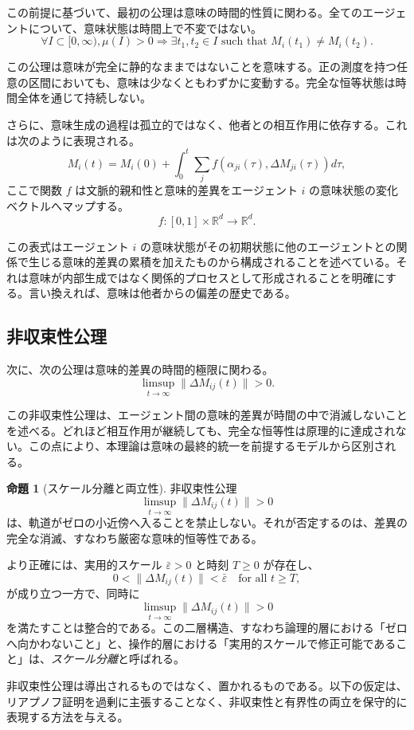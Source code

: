 \documentclass[11pt,a4paper]{article}
\theoremstyle{definition}
\newtheorem{proposition}{命題}[section]
\begin{document}
この前提に基づいて、最初の公理は意味の時間的性質に関わる。全てのエージェントについて、意味状態は時間上で不変ではない。
\[
\forall I \subset [0,\infty), \mu(I) > 0 \Rightarrow \exists t_1, t_2 \in I \text{ such that } M_i(t_1) \neq M_i(t_2).
\]

この公理は意味が完全に静的なままではないことを意味する。正の測度を持つ任意の区間においても、意味は少なくともわずかに変動する。完全な恒等状態は時間全体を通じて持続しない。

さらに、意味生成の過程は孤立的ではなく、他者との相互作用に依存する。これは次のように表現される。
\[
M_i(t) = M_i(0) + \int_0^t \sum_j f(\alpha_{ji}(\tau), \Delta M_{ji}(\tau)) d\tau,
\]
ここで関数 $f$ は文脈的親和性と意味的差異をエージェント $i$ の意味状態の変化ベクトルへマップする。
\[
f : [0, 1] \times \mathbb{R}^d \to \mathbb{R}^d.
\]

この表式はエージェント $i$ の意味状態がその初期状態に他のエージェントとの関係で生じる意味的差異の累積を加えたものから構成されることを述べている。それは意味が内部生成ではなく関係的プロセスとして形成されることを明確にする。言い換えれば、意味は他者からの偏差の歴史である。


\subsection{非収束性公理}

次に、次の公理は意味的差異の時間的極限に関わる。
\[
\limsup_{t \to \infty} \|\Delta M_{ij}(t)\| > 0.
\]

この非収束性公理は、エージェント間の意味的差異が時間の中で消滅しないことを述べる。どれほど相互作用が継続しても、完全な恒等性は原理的に達成されない。この点により、本理論は意味の最終的統一を前提するモデルから区別される。

\begin{proposition}[スケール分離と両立性]
非収束性公理
\[
\limsup_{t \to \infty} \|\Delta M_{ij}(t)\| > 0
\]
は、軌道がゼロの小近傍へ入ることを禁止しない。それが否定するのは、差異の完全な消滅、すなわち厳密な意味的恒等性である。

より正確には、実用的スケール $\bar{\varepsilon}>0$ と時刻 $T\geq 0$ が存在し、
\[
0 < \|\Delta M_{ij}(t)\| < \bar{\varepsilon} \quad \text{for all } t \geq T,
\]
が成り立つ一方で、同時に
\[
\limsup_{t \to \infty} \|\Delta M_{ij}(t)\| > 0
\]
を満たすことは整合的である。この二層構造、すなわち論理的層における「ゼロへ向かわないこと」と、操作的層における「実用的スケールで修正可能であること」は、\textit{スケール分離}と呼ばれる。

非収束性公理は導出されるものではなく、置かれるものである。以下の仮定は、リアプノフ証明を過剰に主張することなく、非収束性と有界性の両立を保守的に表現する方法を与える。
\end{proposition}
\end{document}
